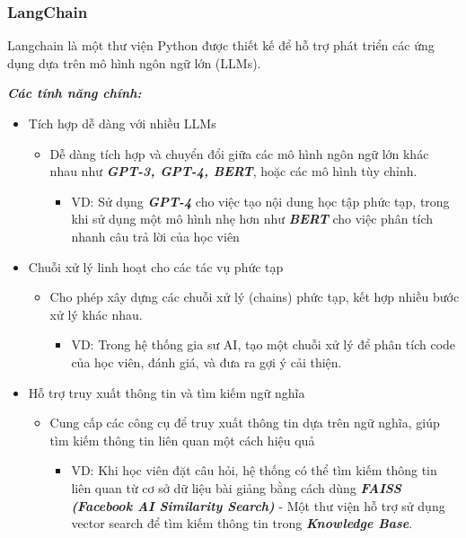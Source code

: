 \subsubsection{LangChain}
Langchain là một thư viện Python được thiết kế để hỗ trợ phát triển các ứng dụng dựa trên mô hình ngôn ngữ lớn (LLMs).
\par 
\textbf{\textit{Các tính năng chính:}}
\begin{itemize}
    \item Tích hợp dễ dàng với nhiều LLMs
    \begin{itemize}
        \item Dễ dàng tích hợp và chuyển đổi giữa các mô hình ngôn ngữ lớn khác nhau như \textbf{\textit{GPT-3, GPT-4, BERT}}, hoặc các mô hình tùy chỉnh.
        \begin{itemize}
            \item VD: Sử dụng \textbf{\textit{GPT-4}} cho việc tạo nội dung học tập phức tạp, trong khi sử dụng một mô hình nhẹ hơn như \textbf{\textit{BERT}} cho việc phân tích nhanh câu trả lời của học viên
        \end{itemize}
    \end{itemize}
    \item Chuỗi xử lý linh hoạt cho các tác vụ phức tạp
        \begin{itemize}
        \item Cho phép xây dựng các chuỗi xử lý (chains) phức tạp, kết hợp nhiều bước xử lý khác nhau.
        \begin{itemize}
            \item VD: Trong hệ thống gia sư AI, tạo một chuỗi xử lý để phân tích code của học viên, đánh giá, và đưa ra gợi ý cải thiện. 
        \end{itemize}
    \end{itemize}
    \item Hỗ trợ truy xuất thông tin và tìm kiếm ngữ nghĩa
        \begin{itemize}
        \item Cung cấp các công cụ để truy xuất thông tin dựa trên ngữ nghĩa, giúp tìm kiếm thông tin liên quan một cách hiệu quả
        \begin{itemize}
            \item VD: Khi học viên đặt câu hỏi, hệ thống có thể tìm kiếm thông tin liên quan từ cơ sở dữ liệu bài giảng bằng cách dùng \textbf{\textit{FAISS (Facebook AI Similarity Search)}} - Một thư viện hỗ trợ sử dụng vector search để tìm kiếm thông tin trong \textbf{\textit{Knowledge Base}}.

\end{itemize}
\end{itemize}
\end{itemize}
